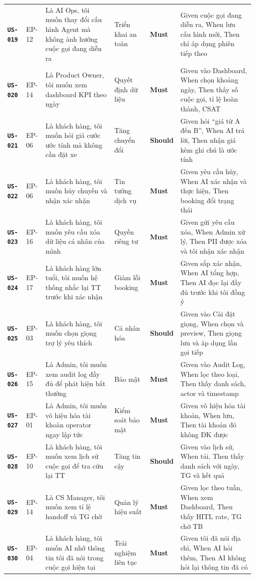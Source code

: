 \documentclass[12pt,a4paper]{article}
\newcommand{\storyid}[1]{\texttt{\textbf{\color{AloPurple}#1}}}
\newcommand{\musthave}{\colorbox{PrioMust}{\small\textbf{Must}}}
\newcommand{\shouldhave}{\colorbox{PrioShould}{\small\textbf{Should}}}
\begin{document}
\begin{longtable}{L{1.5cm} L{1.5cm} L{3.5cm} L{3.5cm} C{1.5cm} L{4cm}}
  \storyid{US-019} & EP-12 & Là AI Ops, tôi muốn thay đổi cấu hình Agent mà không ảnh hưởng cuộc gọi đang diễn ra & Triển khai an toàn & \musthave & Given cuộc gọi đang diễn ra, When lưu cấu hình mới, Then chỉ áp dụng phiên tiếp theo \\
  \storyid{US-020} & EP-14 & Là Product Owner, tôi muốn xem dashboard KPI theo ngày & Quyết định dữ liệu & \musthave & Given vào Dashboard, When chọn khoảng ngày, Then thấy số cuộc gọi, tỉ lệ hoàn thành, CSAT \\
  \storyid{US-021} & EP-06 & Là khách hàng, tôi muốn hỏi giá cước ước tính mà không cần đặt xe & Tăng chuyển đổi & \shouldhave & Given hỏi ``giá từ A đến B'', When AI trả lời, Then nhận giá kèm ghi chú là ước tính \\
  \storyid{US-022} & EP-06 & Là khách hàng, tôi muốn hủy chuyến và nhận xác nhận & Tin tưởng dịch vụ & \musthave & Given yêu cầu hủy, When AI xác nhận và thực hiện, Then booking đổi trạng thái \\
  \storyid{US-023} & EP-16 & Là khách hàng, tôi muốn yêu cầu xóa dữ liệu cá nhân của mình & Quyền riêng tư & \musthave & Given gửi yêu cầu xóa, When Admin xử lý, Then PII được xóa và tôi nhận xác nhận \\
  \storyid{US-024} & EP-17 & Là khách hàng lớn tuổi, tôi muốn hệ thống nhắc lại TT trước khi xác nhận & Giảm lỗi booking & \musthave & Given sắp xác nhận, When AI tổng hợp, Then AI đọc lại đầy đủ trước khi tôi đồng ý \\
  \storyid{US-025} & EP-03 & Là khách hàng, tôi muốn chọn giọng trợ lý yêu thích & Cá nhân hóa & \shouldhave & Given vào Cài đặt giọng, When chọn và preview, Then giọng lưu và áp dụng lần gọi tiếp \\
  \storyid{US-026} & EP-15 & Là Admin, tôi muốn xem audit log đầy đủ để phát hiện bất thường & Bảo mật & \musthave & Given vào Audit Log, When lọc theo loại, Then thấy danh sách, actor và timestamp \\
  \storyid{US-027} & EP-01 & Là Admin, tôi muốn vô hiệu hóa tài khoản operator ngay lập tức & Kiểm soát bảo mật & \musthave & Given vô hiệu hóa tài khoản, When lưu, Then tài khoản đó không ĐK được \\
  \storyid{US-028} & EP-10 & Là khách hàng, tôi muốn xem lịch sử cuộc gọi để tra cứu lại TT & Tăng tin cậy & \shouldhave & Given vào lịch sử, When tải, Then thấy danh sách với ngày, TG và kết quả \\
  \storyid{US-029} & EP-14 & Là CS Manager, tôi muốn xem tỉ lệ handoff và TG chờ & Quản lý hiệu suất & \musthave & Given lọc theo tuần, When xem Dashboard, Then thấy HITL rate, TG chờ TB \\
  \storyid{US-030} & EP-04 & Là khách hàng, tôi muốn AI nhớ thông tin tôi đã nói trong cuộc gọi hiện tại & Trải nghiệm liên tục & \musthave & Given tôi đã nói địa chỉ, When AI hỏi thêm, Then AI không hỏi lại thông tin đã có \\
\end{longtable}
\normalsize
\end{document}
